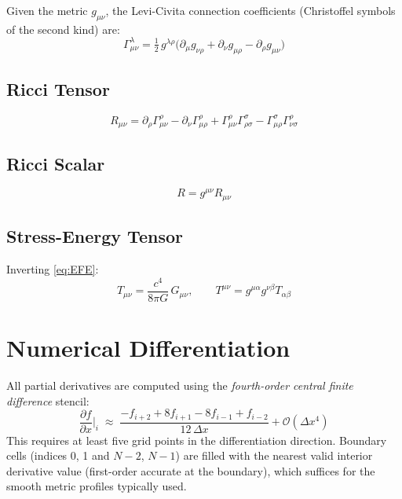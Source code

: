 \documentclass[11pt, a4paper, twoside]{report}
\newcommand{\pd}[2]{\dfrac{\partial #1}{\partial #2}}
\begin{document}
Given the metric $g_{\mu\nu}$, the Levi-Civita connection coefficients
(Christoffel symbols of the second kind) are:
\begin{equation}
  \varGamma^\lambda_{\mu\nu}
  = \tfrac{1}{2}\,g^{\lambda\rho}
    \bigl(\partial_\mu g_{\nu\rho}
         + \partial_\nu g_{\mu\rho}
         - \partial_\rho g_{\mu\nu}\bigr)
  \label{eq:christoffel}
\end{equation}

\subsection{Ricci Tensor}

\begin{equation}
  R_{\mu\nu}
  = \partial_\rho \varGamma^\rho_{\mu\nu}
  - \partial_\nu  \varGamma^\rho_{\mu\rho}
  + \varGamma^\rho_{\mu\nu}\varGamma^\sigma_{\rho\sigma}
  - \varGamma^\sigma_{\mu\rho}\varGamma^\rho_{\nu\sigma}
  \label{eq:ricci}
\end{equation}

\subsection{Ricci Scalar}

\begin{equation}
  R = g^{\mu\nu} R_{\mu\nu}
  \label{eq:riccisc}
\end{equation}

\subsection{Stress-Energy Tensor}

Inverting \cref{eq:EFE}:
\begin{equation}
  T_{\mu\nu} = \frac{c^4}{8\pi G}\,G_{\mu\nu},
  \qquad
  T^{\mu\nu} = g^{\mu\alpha}g^{\nu\beta}T_{\alpha\beta}
  \label{eq:SET}
\end{equation}

\section{Numerical Differentiation}

All partial derivatives are computed using the \emph{fourth-order central
finite difference} stencil:
\begin{equation}
  \pd{f}{x}\bigg|_i
  \;\approx\;
  \frac{-f_{i+2} + 8f_{i+1} - 8f_{i-1} + f_{i-2}}{12\,\Delta x}
  + \mathcal{O}(\Delta x^4)
  \label{eq:fd4}
\end{equation}
This requires at least five grid points in the differentiation direction.
Boundary cells (indices 0, 1 and $N{-}2$, $N{-}1$) are filled with the
nearest valid interior derivative value (first-order accurate at the
boundary), which suffices for the smooth metric profiles typically used.
\end{document}
